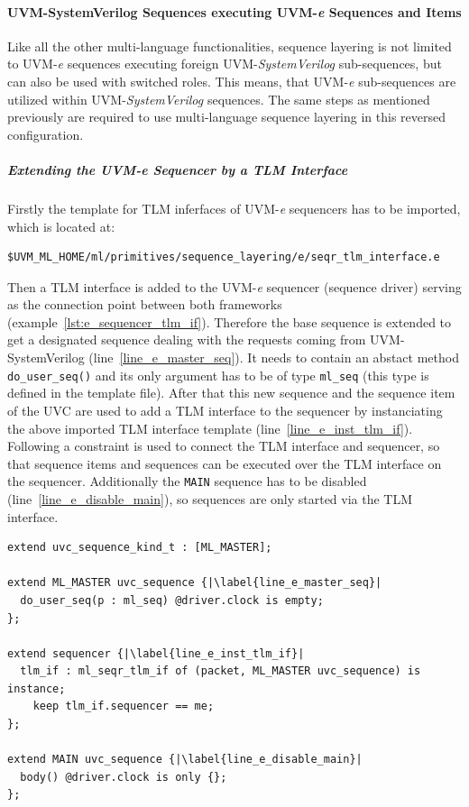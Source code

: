 \paragraph{UVM-SystemVerilog Sequences executing UVM-\textit{e} Sequences and Items}
Like all the other multi-language functionalities, sequence layering is not limited to UVM-\textit{e} sequences executing foreign UVM-\emph{SystemVerilog} sub-sequences, but can also be used with switched roles. This means, that UVM-\textit{e} sub-sequences are utilized within UVM-\emph{SystemVerilog} sequences. The same steps as mentioned previously are required to use multi-language sequence layering in this reversed configuration. 
\subparagraph{Extending the UVM-\textit{e} Sequencer by a TLM Interface}
Firstly the template for TLM inferfaces of UVM-\textit{e} sequencers has to be imported, which is located at:
\smallskip
{}
\begin{lstlisting}
$UVM_ML_HOME/ml/primitives/sequence_layering/e/seqr_tlm_interface.e
\end{lstlisting} 
\smallskip
Then a TLM interface is added to the UVM-\textit{e} sequencer (sequence driver) serving as the connection point between both frameworks (example~\ref{lst:e_sequencer_tlm_if}). Therefore the base sequence is extended to get a designated sequence dealing with the requests coming from UVM-SystemVerilog (line~\ref{line_e_master_seq}). It needs to contain an abstact method \lstinline$do_user_seq()$ and its only argument has to be of type \lstinline$ml_seq$ (this type is defined in the template file).
After that this new sequence and the sequence item of the UVC are used to add a TLM interface to the sequencer by instanciating the above imported TLM interface template (line~\ref{line_e_inst_tlm_if}). Following a constraint is used to connect the TLM interface and sequencer, so that sequence items and sequences can be executed over the TLM interface on the sequencer.
Additionally the \lstinline$MAIN$ sequence has to be disabled (line~\ref{line_e_disable_main}), so sequences are only started via the TLM interface.
\lstset{language=e, numbers = left, escapechar=|, breaklines=true}
\begin{lstlisting}[frame=htrbl, caption={\textit{e}: adding a TLM interface to the UVM-\textit{e} sequencer},
label={lst:e_sequencer_tlm_if}]
extend uvc_sequence_kind_t : [ML_MASTER];

extend ML_MASTER uvc_sequence {|\label{line_e_master_seq}|
  do_user_seq(p : ml_seq) @driver.clock is empty;
};

extend sequencer {|\label{line_e_inst_tlm_if}|
  tlm_if : ml_seqr_tlm_if of (packet, ML_MASTER uvc_sequence) is instance;
    keep tlm_if.sequencer == me;
};

extend MAIN uvc_sequence {|\label{line_e_disable_main}|
  body() @driver.clock is only {};
};
\end{lstlisting}
